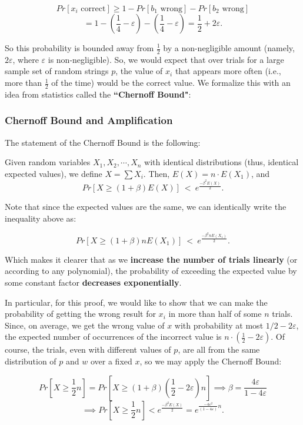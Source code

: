 \documentclass[11pt]{article}
\begin{document}
\[Pr[x_i\text{ correct}] \ge 1-Pr[b_1\text{ wrong}]-Pr[b_2\text{ wrong}]\]
\[=1-\left(\frac{1}{4}-\varepsilon\right)-\left(\frac{1}{4}-\varepsilon\right) = \frac{1}{2}+2\varepsilon.\]

So this probability is bounded away from \(\frac{1}{2}\) by a non-negligible amount (namely, \(2\varepsilon\), where \(\varepsilon\) is non-negligible). So, we would expect that over trials for a large sample set of random strings \(p\), the value of \(x_i\) that appears more often (i.e., more than \(\frac{1}{2}\) of the time) would be the correct value. We formalize this with an idea from statistics called the \textbf{``Chernoff Bound"}:


\newpage
\subsubsection{Chernoff Bound and Amplification}
The statement of the Chernoff Bound is the following:\bigskip

Given random variables \(X_1,X_2,\cdots,X_n\) with identical distributions (thus, identical expected values), we define \(X = \sum X_i\). Then, \(E(X) = n\cdot E(X_1)\), and
\[Pr[X\ge (1+\beta)E(X)]\: <\: e^{\frac{-\beta^2E(X)}{2}}.\]

Note that since the expected values are the same, we can identically write the inequality above as:

\[Pr[X\ge (1+\beta)nE(X_1)]\: <\: e^{\frac{-\beta^2nE(X_1)}{2}}.\]

Which makes it clearer that as we \textbf{increase the number of trials linearly} (or according to any polynomial), the probability of exceeding the expected value by some constant factor \textbf{decreases exponentially}.\bigskip

In particular, for this proof, we would like to show that we can make the probability of getting the wrong result for \(x_i\) in more than half of some \(n\) trials. Since, on average, we get the wrong value of \(x\) with probability at most \(1/2-2\varepsilon\), the expected number of occurrences of the incorrect value is \(n\cdot(\frac{1}{2}-2\varepsilon)\). Of course, the trials, even with different values of \(p\), are all from the same distribution of \(p\) and \(w\) over a fixed \(x\), so we may apply the Chernoff Bound:

\[Pr\left[X\ge\frac{1}{2}n\right] = Pr\left[X\ge (1+\beta)\left(\frac{1}{2}-2\varepsilon\right)n\right]\implies \beta = \frac{4\varepsilon}{1-4\varepsilon}\]
\[\implies Pr\left[X\ge\frac{1}{2}n\right] < e^{\frac{-\beta^2E(X)}{2}} = e^{\frac{-4\varepsilon^2}{(1-4\varepsilon)}n}.\]
\end{document}
